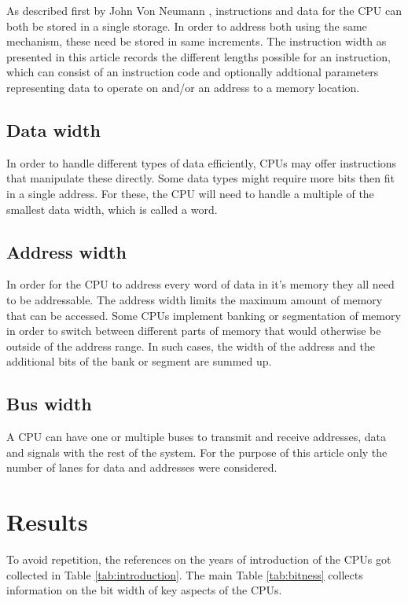 \documentclass[twoside,twocolumn]{article}
\begin{document}
As described first by John Von Neumann \cite{edvac}, instructions and data for the CPU
can both be stored in a single storage. In order to address both using the same
mechanism, these need be stored in same increments. The instruction width as presented
in this article records the different lengths possible for an instruction, which can
consist of an instruction code and optionally addtional parameters representing data to
operate on and/or an address to a memory location.

\subsection{Data width}

In order to handle different types of data efficiently, CPUs may offer instructions that
manipulate these directly. Some data types might require more bits then fit in a single
address. For these, the CPU will need to handle a multiple of the smallest data width,
which is called a word.

\subsection{Address width}

In order for the CPU to address every word of data in it's memory they all need to be
addressable. The address width limits the maximum amount of memory that can be accessed.
Some CPUs implement banking or segmentation of memory in order to switch between
different parts of memory that would otherwise be outside of the address range. In such
cases, the width of the address and the additional bits of the bank or segment are
summed up.

\subsection{Bus width}

A CPU can have one or multiple buses to transmit and receive addresses, data and signals
with the rest of the system. For the purpose of this article only the number of lanes for
data and addresses were considered.


\section{Results}

To avoid repetition, the references on the years of introduction of the CPUs got collected in Table \ref{tab:introduction}. The main Table \ref{tab:bitness} collects information on the bit width of key aspects of the CPUs.
\end{document}
